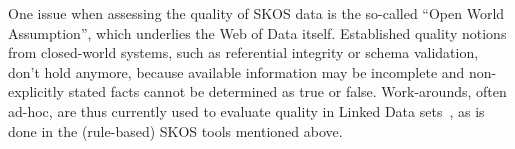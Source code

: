 One issue when assessing the quality of SKOS data is the so-called ``Open World Assumption'', which underlies the Web of Data itself. Established quality notions from closed-world systems, such as referential integrity or schema validation, don't hold anymore, because available information may be incomplete and non-explicitly stated facts cannot be determined as true or false.  Work-arounds, often ad-hoc, are thus currently used to evaluate quality in Linked Data sets~\cite{Heath2011}, as is done in the (rule-based) SKOS tools mentioned above.







